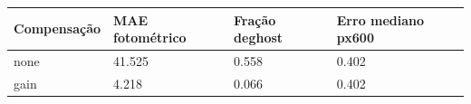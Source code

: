 \begin{tabular}{llll}
\hline
Compensação & MAE fotométrico & Fração deghost & Erro mediano px600 \\ \hline
none & 41.525 & 0.558 & 0.402 \\
gain & 4.218 & 0.066 & 0.402 \\
\hline
\end{tabular}
